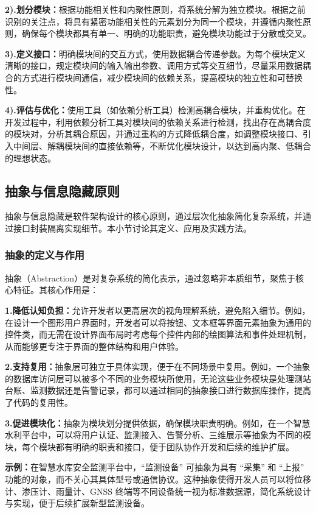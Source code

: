 \textbf{2).划分模块：}根据功能相关性和内聚性原则，将系统分解为独立模块。根据之前识别的关注点，将具有紧密功能相关性的元素划分为同一个模块，并遵循内聚性原则，确保每个模块都具有单一、明确的功能职责，避免模块功能过于分散或交叉。

\textbf{3).定义接口：}明确模块间的交互方式，使用数据耦合传递参数。为每个模块定义清晰的接口，规定模块间的输入输出参数、调用方式等交互细节，尽量采用数据耦合的方式进行模块间通信，减少模块间的依赖关系，提高模块的独立性和可替换性。

\textbf{4).评估与优化：}使用工具（如依赖分析工具）检测高耦合模块，并重构优化。在开发过程中，利用依赖分析工具对模块间的依赖关系进行检测，找出存在高耦合度的模块对，分析其耦合原因，并通过重构的方式降低耦合度，如调整模块接口、引入中间层、解耦模块间的直接依赖等，不断优化模块设计，以达到高内聚、低耦合的理想状态。

\subsection{抽象与信息隐藏原则}

抽象与信息隐藏是软件架构设计的核心原则，通过层次化抽象简化复杂系统，并通过接口封装隔离实现细节。本小节讨论其定义、应用及实践方法。

\subsubsection{抽象的定义与作用}
抽象（Abstraction）是对复杂系统的简化表示，通过忽略非本质细节，聚焦于核心特征。其核心作用是：

\textbf{1.降低认知负担：}允许开发者以更高层次的视角理解系统，避免陷入细节。例如，在设计一个图形用户界面时，开发者可以将按钮、文本框等界面元素抽象为通用的控件类，而无需在设计界面布局时考虑每个控件内部的绘图算法和事件处理机制，从而能够更专注于界面的整体结构和用户体验。

\textbf{2.支持复用：}抽象层可独立于具体实现，便于在不同场景中复用。例如，一个抽象的数据库访问层可以被多个不同的业务模块所使用，无论这些业务模块是处理测站台账、监测数据还是告警记录，都可以通过相同的抽象接口进行数据库操作，提高了代码的复用性。

\textbf{3.促进模块化：}抽象为模块划分提供依据，确保模块职责明确。例如，在一个智慧水利平台中，可以将用户认证、监测接入、告警分析、三维展示等抽象为不同的模块，每个模块都有明确的职责和接口，便于团队协作开发和后续的维护扩展。

\textbf{示例：}在智慧水库安全监测平台中，“监测设备” 可抽象为具有 “采集” 和 “上报” 功能的对象，而不关心其具体型号或通信协议。这种抽象使得开发人员可以将位移计、渗压计、雨量计、GNSS 终端等不同设备统一视为标准数据源，简化系统设计与实现，便于后续扩展新型监测设备。

